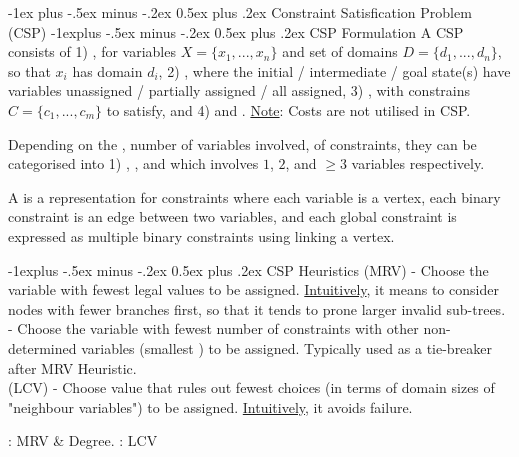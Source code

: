 \documentclass[10pt,landscape,letterpaper]{article}
\makeatletter
\renewcommand{\section}{\@startsection{section}{1}{0mm}%
                                {-1ex plus -.5ex minus -.2ex}%
                                {0.5ex plus .2ex}%
                                {\sffamily\large}}
\renewcommand{\subsection}{\@startsection{subsection}{2}{0mm}%
                                {-1explus -.5ex minus -.2ex}%
                                {0.5ex plus .2ex}%
                                {\sffamily\normalsize\itshape}}
\makeatother
\begin{document}
\begin{multicols}{3}
\section{Constraint Satisfication Problem (CSP)}
\subsection{CSP Formulation}
A CSP consists of 1) , for variables $X = \{ x_1, ..., x_n \}$ and set of domains $D = \{ d_1, ..., d_n \}$, so that $x_i$ has domain $d_i$, 2) , where the initial / intermediate / goal state(s) have variables unassigned / partially assigned / all assigned, 3) , with constrains $C = \{c_1, ..., c_m \}$ to satisfy, and 4)  and . \underline{Note}: Costs are not utilised in CSP.

\smallskip

Depending on the , number of variables involved, of constraints, they can be categorised into 1) , , and  which involves $1$, $2$, and $\geq 3$ variables respectively.
\smallskip

A  is a representation for constraints where each variable is a vertex, each binary constraint is an edge between two variables, and each global constraint is expressed as multiple binary constraints using linking a vertex.

\subsection{CSP Heuristics}
 (MRV) - Choose the variable with fewest legal values to be assigned. \underline{Intuitively}, it means to consider nodes with fewer branches first, so that it tends to prone larger invalid sub-trees.
\\
 - Choose the variable with fewest number of constraints with other non-determined variables (smallest ) to be assigned. Typically used as a tie-breaker after MRV Heuristic.
\\
 (LCV) - Choose value that rules out fewest choices (in terms of domain sizes of "neighbour variables") to be assigned. \underline{Intuitively}, it avoids failure.

\smallskip

: MRV \& Degree. : LCV


\end{multicols}
\end{document}
